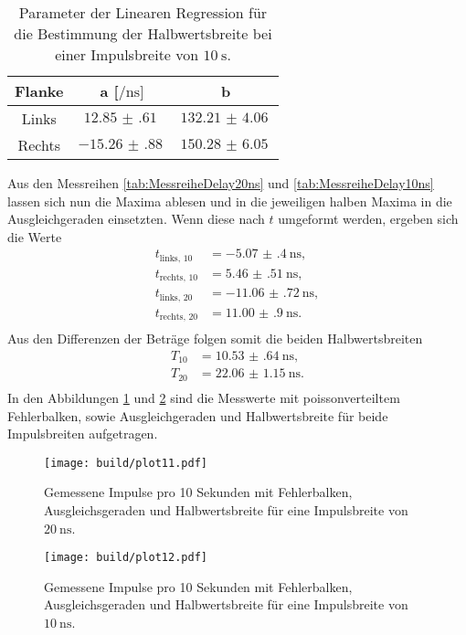 \begin{table}
    \centering
    \caption{Parameter der Linearen Regression für die Bestimmung der Halbwertsbreite bei einer Impulsbreite von $\SI{10}{\second}$.} 
    \label{tab:332211}
    \begin{tabular}{c | c c }
        \toprule
        Flanke & a [$\si{\per\nano\second}] $ & b \\
        \midrule
            Links    &      $\SI{12.85(61)}{}$      &    $\SI{132.21(406)}{}$  \\               
            Rechts    &     $\SI{-15.26(88)}{}$      &  $\SI{150.28(605)}{}$   \\ 
    \end{tabular}
\end{table}

Aus den Messreihen \ref{tab:MessreiheDelay20ns} und \ref{tab:MessreiheDelay10ns} lassen sich nun die Maxima ablesen und in die jeweiligen halben Maxima in die Ausgleichgeraden einsetzten.
Wenn diese nach $t$ umgeformt werden, ergeben sich die Werte
\begin{align*}
t_{\text{links, }10} &= \SI{-5.07(40)}{\nano\second},\\
t_{\text{rechts, }10} &= \SI{5.46(51)}{\nano\second},\\
t_{\text{links, }20} &= \SI{-11.06(72)}{\nano\second},\\
t_{\text{rechts, }20} &= \SI{11.00(90)}{\nano\second}.\\
\end{align*}
Aus den Differenzen der Beträge folgen somit die beiden Halbwertsbreiten
\begin{align*}
T_{10} &= \SI{10.53(64)}{\nano\second},\\
T_{20} &= \SI{22.06(115)}{\nano\second}.\\
\end{align*}
In den Abbildungen \ref{fig:111} und \ref{fig:222} sind die Messwerte mit poissonverteiltem Fehlerbalken, sowie Ausgleichgeraden und Halbwertsbreite für beide Impulsbreiten 
aufgetragen.
\begin{figure}
    \centering
    \texttt{[image: build/plot11.pdf]}
    \caption{Gemessene Impulse pro 10 Sekunden mit Fehlerbalken, Ausgleichsgeraden und Halbwertsbreite für eine Impulsbreite von $\SI{20}{\nano\second}$.} 
    \label{fig:111}
\end{figure}
\begin{figure}
    \centering
    \texttt{[image: build/plot12.pdf]}
    \caption{Gemessene Impulse pro 10 Sekunden mit Fehlerbalken, Ausgleichsgeraden und Halbwertsbreite für eine Impulsbreite von $\SI{10}{\nano\second}$.} 
    \label{fig:222}
\end{figure}

